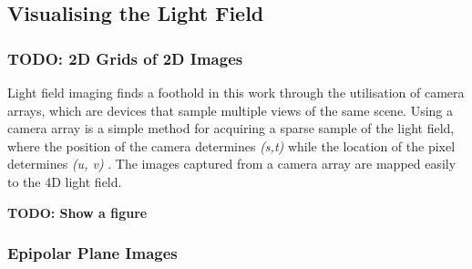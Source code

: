 \subsection{Visualising the Light Field}
\subsubsection{TODO: 2D Grids of 2D Images}

Light field imaging finds a foothold in this work through the utilisation of camera arrays, which are devices that sample multiple views of the same scene. Using a camera array is a simple method for acquiring a sparse sample of the light field, where the position of the camera determines \textit{(s,t)} while the location of the pixel determines \textit{(u, v)} \cite{yao2016camarray}. The images captured from a camera array are mapped easily to the 4D light field.

\textbf{TODO: Show a figure}

\subsubsection{Epipolar Plane Images}

